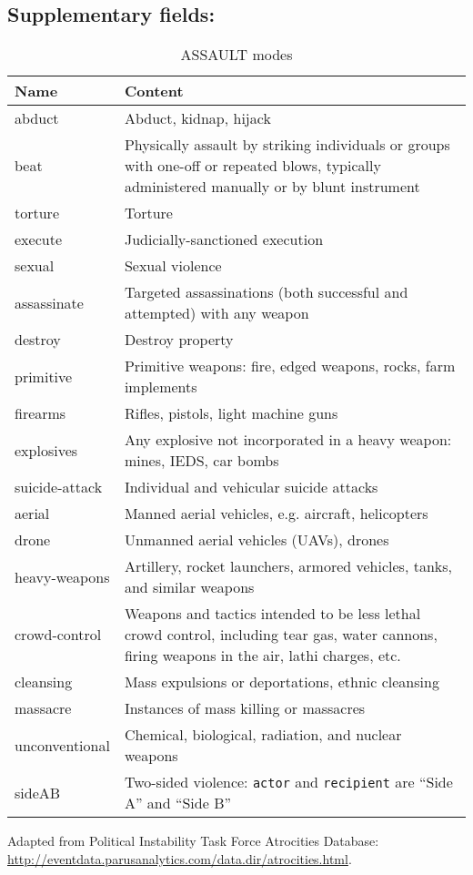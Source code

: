 \documentclass[11pt]{report}
\newcommand{\txt}[1]{\texttt{#1}}
\begin{document}
\subsection{Supplementary fields:}


\begin{table}[htp]
\caption{ASSAULT modes}
\begin{center}
\begin{tabular}{|p{}|p{}|}
\hline
Name & Content \\
\hline
abduct & Abduct, kidnap, hijack \\
beat & Physically assault by striking individuals or groups with one-off or repeated blows, typically administered manually or by blunt instrument\\
torture & Torture \\
execute & Judicially-sanctioned execution \\
sexual & Sexual violence\\
assassinate & Targeted assassinations (both successful and attempted) with any weapon \\
destroy & Destroy property \\
primitive & Primitive weapons: fire, edged weapons, rocks, farm implements \\
firearms & Rifles, pistols, light machine guns\\
explosives & Any explosive not incorporated in a heavy weapon: mines, IEDS, car bombs \\
suicide-attack & Individual and vehicular suicide attacks \\
aerial & Manned aerial vehicles, e.g. aircraft, helicopters \\
drone & Unmanned aerial vehicles (UAVs), drones \\
heavy-weapons & Artillery, rocket launchers, armored vehicles, tanks, and similar weapons \\
crowd-control & Weapons and tactics intended to be less lethal crowd control, including tear gas, water cannons, firing weapons in the air, lathi charges, etc. \\
cleansing & Mass expulsions or deportations, ethnic cleansing  \\
massacre & Instances of mass killing or massacres  \\
unconventional & Chemical, biological, radiation, and nuclear weapons  \\
sideAB & Two-sided violence: \txt{actor} and \txt{recipient} are ``Side A'' and ``Side B'' \\
\hline
\end{tabular}
\end{center}
\label{tab:violmode}
\raggedright{Adapted from Political Instability Task Force Atrocities Database: \url{http://eventdata.parusanalytics.com/data.dir/atrocities.html}}.
\end{table}%
\end{document}
